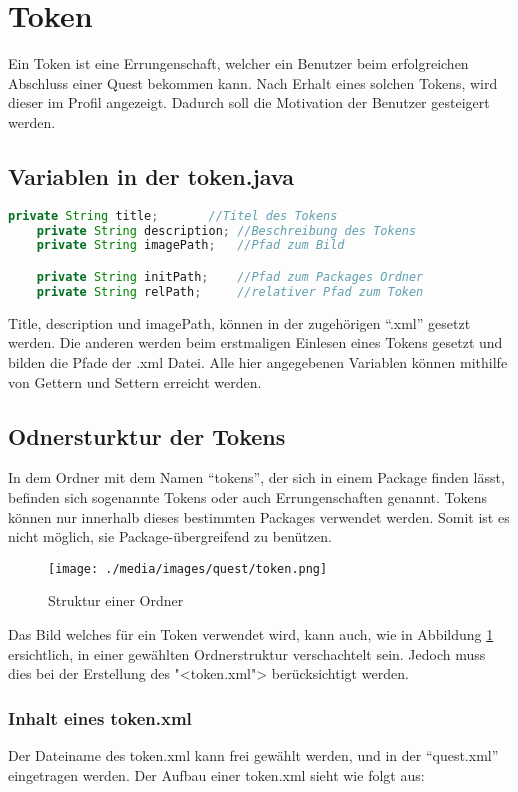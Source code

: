 \section{Token}
Ein Token ist eine Errungenschaft, welcher ein Benutzer beim erfolgreichen Abschluss einer Quest bekommen kann. Nach Erhalt eines solchen Tokens, wird dieser im Profil angezeigt. Dadurch soll die Motivation der Benutzer gesteigert werden. 

\subsection{Variablen in der token.java}

\begin{lstlisting}[language=JAVA]
	private String title;		//Titel des Tokens
	private String description;	//Beschreibung des Tokens
	private String imagePath;	//Pfad zum Bild

	private String initPath;	//Pfad zum Packages Ordner 
	private String relPath;		//relativer Pfad zum Token
\end{lstlisting}
Title, description und imagePath, können in der zugehörigen "`.xml"' gesetzt werden. Die anderen werden beim erstmaligen Einlesen eines Tokens gesetzt und bilden die Pfade der .xml Datei. Alle hier angegebenen Variablen können mithilfe von Gettern und Settern erreicht werden.

\subsection{Odnersturktur der Tokens}
In dem Ordner mit dem Namen "`tokens"', der sich in einem Package finden lässt, befinden sich sogenannte Tokens oder auch Errungenschaften genannt. Tokens können nur innerhalb dieses bestimmten Packages verwendet werden. Somit ist es nicht möglich, sie Package-übergreifend zu benützen.
\begin{figure}[h] 
  \centering
     \texttt{[image: ./media/images/quest/token.png]}
  \caption{Struktur einer Ordner}
  \label{fig:struct_token}
\end{figure}

Das Bild welches für ein Token verwendet wird, kann auch, wie in Abbildung \ref{fig:struct_token} ersichtlich, in einer gewählten Ordnerstruktur verschachtelt sein. Jedoch muss dies bei der Erstellung des "<token.xml"> berücksichtigt werden.

\subsubsection{Inhalt eines token.xml}
Der Dateiname des token.xml kann frei gewählt werden, und in der "`quest.xml"' eingetragen werden. Der Aufbau einer token.xml sieht wie folgt aus:

